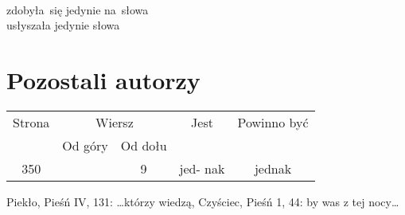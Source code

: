 \documentclass[a4paper,11pt]{article}
\begin{document}
\vspace{\spaceTwo}


\noindent
{} \\
\Jest  zdobyła~się jedynie na~słowa \\
\Powin usłyszała jedynie słowa \\












\newpage
\section{Pozostali autorzy}

\vspace{\spaceTwo}




\vspace{0em}





\begin{center}

  \begin{tabular}{|c|c|c|c|c|}
    \hline
    Strona & \multicolumn{2}{c|}{Wiersz} & Jest
                              & Powinno być \\ \cline{2-3}
    & Od góry & Od dołu & & \\
    \hline
    350 & & 9 & jed- nak & jednak \\
    \hline
  \end{tabular}

\end{center}

\vspace{\spaceTwo}


Piekło, Pieśń IV, 131: \ldots którzy wiedzą, Czyściec, Pieśń 1, 44: by was
z tej nocy\ldots
\end{document}

